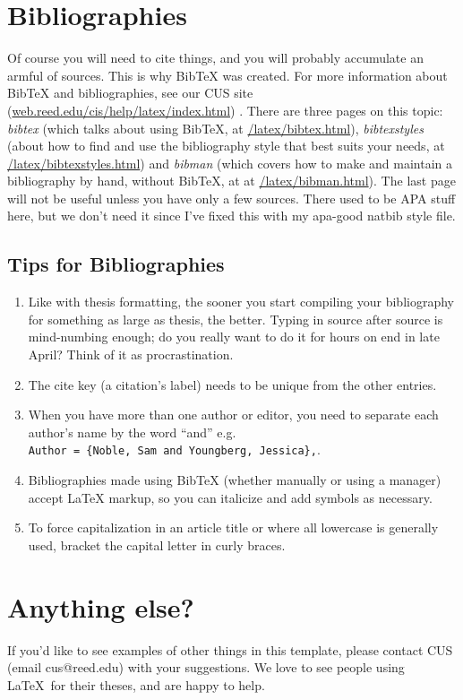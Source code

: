 \documentclass[12pt,twoside]{reedthesis}
\begin{document}
   \section{Bibliographies}
   Of course you will need to cite things, and you will probably accumulate an armful of sources. This is why BibTeX was created. For more information about BibTeX and bibliographies, see our CUS site (\url{web.reed.edu/cis/help/latex/index.html}) . There are three pages on this topic: {\it bibtex} (which talks about using BibTeX, at \url{/latex/bibtex.html}), {\it bibtexstyles} (about how to find and use the bibliography style that best suits your needs, at \url{/latex/bibtexstyles.html}) and {\it bibman} (which covers how to make and maintain a bibliography by hand, without BibTeX, at at \url{/latex/bibman.html}). The last page will not be useful unless you have only a few sources. There used to be APA stuff here, but we don't need it since I've fixed this with my apa-good natbib style file.
   
   \subsection{Tips for Bibliographies}
   \begin{enumerate}
   	\item Like with thesis formatting, the sooner you start compiling your bibliography for something as large as thesis, the better. Typing in source after source is mind-numbing enough; do you really want to do it for hours on end in late April? Think of it as procrastination.
   	\item The cite key (a citation's label) needs to be unique from the other entries.
   	\item When you have more than one author or editor, you need to separate each author's name by the word ``and'' e.g.\\ \verb+Author = {Noble, Sam and Youngberg, Jessica},+.
   	\item Bibliographies made using BibTeX (whether manually or using a manager) accept LaTeX markup, so you can italicize and add symbols as necessary.
   	\item To force capitalization in an article title or where all lowercase is generally used, bracket the capital letter in curly braces.

   \end{enumerate}
   \section{Anything else?}
   If you'd like to see examples of other things in this template, please contact CUS (email cus@reed.edu) with your suggestions. We love to see people using \LaTeX\ for their theses, and are happy to help.
   
\end{document}

